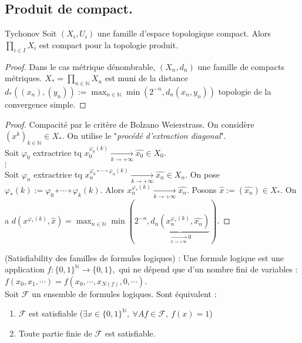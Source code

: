 \subsection{Produit de compact.}
\begin{theoreme}{Tychonov}
    Soit $(X_i,U_i)$ une famille d'espace topologique compact. Alors $\prod\limits_{i\in I}^{} X_i $ est compact pour la topologie produit.
\end{theoreme}
\begin{proof}
    Dans le cas métrique dénombrable, $(X_n,d_n)$ une famille de compacts métriques. $X_*=\prod\limits_{n\in \mathbb{N} }^{} X_n $ est muni de la distance $d_*((x_{n}),(y_n)):=\max_{n\in \mathbb{N} }\min\left( 2^{-n},d_n(x_n,y_n) \right) $ topologie de la convergence simple.
\end{proof}
\begin{proof}
    Compacité par le critère de Bolzano Weierstrass. On considère $(x^k)_{k\in \mathbb{N} }\in X_*.$ On utilise le "\textit{procédé d'extraction diagonal}".  \\
    Soit $\varphi _0$ extractrice tq $x_0^{\varphi _0(k)}\underset{k\to +\infty}{\longrightarrow} \hat{x_0}\in X_0.$ \\
    $\vdots$\\
    Soit $\varphi _n$ extractrice tq $x_n^{\varphi _0\circ\cdots\circ\varphi _n(k)}\underset{k\to +\infty}{\longrightarrow} \hat{x_n}\in X_n.$
    On pose $\varphi _*(k):=\varphi _0\circ\cdots\circ\varphi _k(k)$. Alors $x_n^{\varphi _*(k)}\underset{k\to +\infty}{\longrightarrow} \hat{x_n}$. Posons $\hat{x}:=(\hat{x_n})\in X_*.$ On a $d(x^{\varphi _*(k)},\hat{x})=\max_{n\in \mathbb{N} }\min(2^{-n}, \underbrace{d_n(x_n^{\varphi _*(k)},\hat{x_n})}_{\underset{k\to +\infty}{\longrightarrow} 0})$.
\end{proof}
\begin{ex}
    (Satisfiability des familles de formules logiques) : Une formule logique est une application $f: \{0,1\} ^\mathbb{N} \to \{0,1\} ,$ qui ne dépend que d'un nombre fini de variables : $f(x_0,x_1,\cdots) = f(x_0,\cdots,x_{N(f)},0,\cdots)$. \\
    Soit $\mathcal{F}$ un ensemble de formules logiques. Sont équivalent :
    \begin{enumerate}
        \item $\mathcal{F}$ est satisfiable ($\exists x\in \{0,1\} ^\mathbb{N} ,\ \forall Af\in \mathcal{F},\ f(x)=1$)
        \item Toute partie finie de $\mathcal{F}$ est satisfiable.
    \end{enumerate}
\end{ex}
